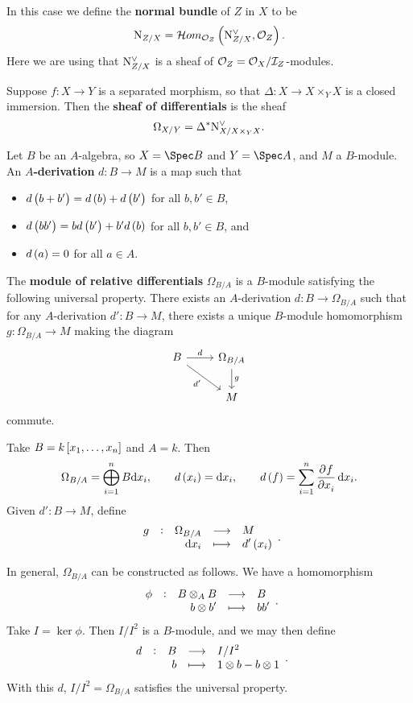 In this case we define the \textbf{normal bundle} of $ Z $ in $ X $ to be
$$ \N_{Z / X} = \HOM_{\OOO_Z}\br{\N_{Z / X}^\vee, \OOO_Z}. $$
Here we are using that $ \mathrm{N}_{Z / X}^\vee $ is a sheaf of $ \mathcal{O}_Z = \mathcal{O}_X / \mathcal{I}_Z $-modules.

\begin{definition*}
Suppose $ f : X \to Y $ is a separated morphism, so that $ \Delta : X \to X \times_Y X $ is a closed immersion. Then the \textbf{sheaf of differentials} is the sheaf
$$ \Omega_{X / Y} = \Delta^*\mathrm{N}_{X / X \times_Y X}^\vee. $$
\end{definition*}


Let $ B $ be an $ A $-algebra, so $ X = \Spec B $ and $ Y = \Spec A $, and $ M $ a $ B $-module. An \textbf{$ A $-derivation} $ d : B \to M $ is a map such that
\begin{itemize}
\item $ d\br{b + b'} = d\br{b} + d\br{b'} $ for all $ b, b' \in B $,
\item $ d\br{bb'} = bd\br{b'} + b'd\br{b} $ for all $ b, b' \in B $, and
\item $ d\br{a} = 0 $ for all $ a \in A $.
\end{itemize}
The \textbf{module of relative differentials} $ \Omega_{B / A} $ is a $ B $-module satisfying the following universal property. There exists an $ A $-derivation $ d : B \to \Omega_{B / A} $ such that for any $ A $-derivation $ d' : B \to M $, there exists a unique $ B $-module homomorphism $ g : \Omega_{B / A} \to M $ making the diagram
$$
\begin{tikzcd}
B \arrow{r}{d} \arrow{dr}[swap]{d'} & \Omega_{B / A} \arrow{d}{g} \\
& M
\end{tikzcd}
$$
commute.

\begin{example*}
Take $ B = k\sbr{x_1, \dots, x_n} $ and $ A = k $. Then
$$ \Omega_{B / A} = \bigoplus_{i = 1}^n B\d x_i, \qquad d\br{x_i} = \d x_i, \qquad d\br{f} = \sum_{i = 1}^n \dpd{f}{x_i}\d x_i. $$
Given $ d' : B \to M $, define
$$ \function[g]{\Omega_{B / A}}{M}{\d x_i}{d'\br{x_i}}. $$
\end{example*}

\pagebreak

\begin{remark*}
In general, $ \Omega_{B / A} $ can be constructed as follows. We have a homomorphism
$$ \function[\phi]{B \otimes_A B}{B}{b \otimes b'}{bb'}. $$
Take $ I = \ker \phi $. Then $ I / I^2 $ is a $ B $-module, and we may then define
$$ \function[d]{B}{I / I^2}{b}{1 \otimes b - b \otimes 1}. $$
With this $ d $, $ I / I^2 = \Omega_{B / A} $ satisfies the universal property.
\end{remark*}

